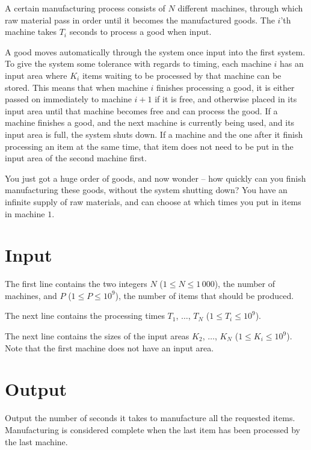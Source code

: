 A certain manufacturing process consists of $N$ different machines, through which raw material pass in order until it becomes the manufactured goods.
The $i$'th machine takes $T_i$ seconds to process a good when input.

A good moves automatically through the system once input into the first system.
To give the system some tolerance with regards to timing, each machine $i$ has an input area where $K_i$ items waiting to be processed by that machine can be stored.
This means that when machine $i$ finishes processing a good, it is either passed on immediately to machine $i + 1$ if it is free, and otherwise placed in its input area until that machine becomes free and can process the good.
If a machine finishes a good, and the next machine is currently being used, and its input area is full, the system shuts down.
If a machine and the one after it finish processing an item at the same time, that item does not need to be put in the input area of the second machine first.

You just got a huge order of goods, and now wonder -- how quickly can you finish manufacturing these goods, without the system shutting down?
You have an infinite supply of raw materials, and can choose at which times you put in items in machine $1$.

\section*{Input}
The first line contains the two integers $N$ ($1 \le N \le 1\,000$), the number of machines, and $P$ ($1 \le P \le 10^9$), the number of items that should be produced.

The next line contains the processing times $T_1$, $\dots$, $T_N$ ($1 \le T_i \le 10^9$).

The next line contains the sizes of the input areas $K_2$, $\dots$, $K_N$ ($1 \le K_i \le 10^9$).
Note that the first machine does not have an input area.

\section*{Output}
Output the number of seconds it takes to manufacture all the requested items.
Manufacturing is considered complete when the last item has been processed by the last machine.
